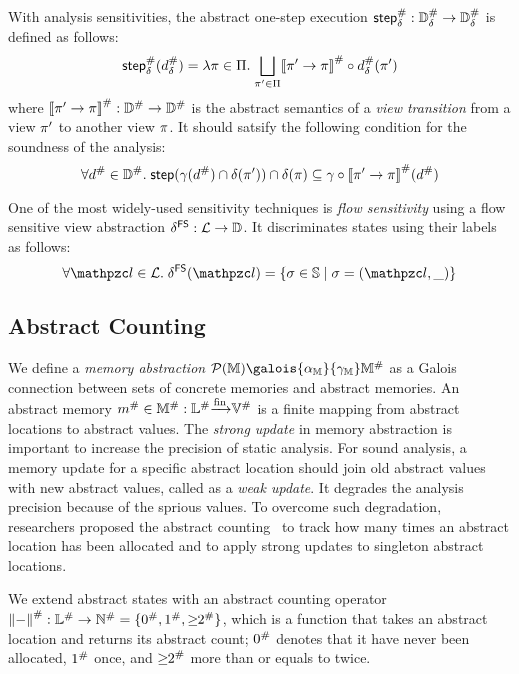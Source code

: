 With analysis sensitivities, the abstract one-step execution ${\textsf{step}}^{\#}_\delta:
{\mathbb{D}}^{\#}_\delta \rightarrow {\mathbb{D}}^{\#}_\delta$ is defined as follows:
\[
  {\textsf{step}}^{\#}_\delta({d}^{\#}_\delta) = \lambda \pi \in \Pi. \; \underset{\pi' \in
  \Pi}{\bigsqcup}{{[\![{\pi' \rightarrow \pi}]\!]}^{\#} \circ {d}^{\#}_\delta(\pi')}
\]
where ${[\![{\pi' \rightarrow \pi}]\!]}^{\#}: {\mathbb{D}}^{\#} \rightarrow {\mathbb{D}}^{\#}$ is the abstract
semantics of a \textit{view transition} from a view $\pi'$ to another view
$\pi$.  It should satsify the following condition for the soundness of the
analysis:
\[
  \forall {d}^{\#} \in {\mathbb{D}}^{\#}. \; \textsf{step}(\gamma({d}^{\#}) \cap \delta(\pi'))
  \cap \delta(\pi) \subseteq \gamma \circ
  {[\![{\pi' \rightarrow \pi}]\!]}^{\#}({d}^{\#})
\]

One of the most widely-used sensitivity techniques is \textit{flow sensitivity}
using a flow sensitive view abstraction $\delta^{\textsf{FS}}: \mathcal{L} \rightarrow \mathbb{D}$.
It discriminates states using their labels as follows:
\[
  \forall \lab \in \labset. \; \fsviewmap(\lab) = \{ \st \in \stset \mid \st =
  (\lab, \_) \}
\]


\subsection{Abstract Counting}

We define a \textit{memory abstraction} $\powerset{\memset}
\galois{\alpha_\memset}{\gamma_\memset} \absmemset$ as a Galois connection
between sets of concrete memories and abstract memories.  An abstract memory
${m}^{\#} \in {\mathbb{M}}^{\#}: {\mathbb{L}}^{\#} {\xrightarrow[]{\text{fin}}} {\mathbb{V}}^{\#}$ is a finite mapping from
abstract locations to abstract values.  The \textit{strong update} in memory
abstraction is important to increase the precision of static analysis.  For
sound analysis, a memory update for a specific abstract location should join old
abstract values with new abstract values, called as a \textit{weak update}.
It degrades the analysis precision because of the sprious values.  To overcome
such degradation, researchers proposed the abstract
counting~\cite{abstract-gc-counting, revisit-recency} to track how many times an
abstract location has been allocated and to apply strong updates to singleton
abstract locations.

We extend abstract states with an abstract counting operator ${\lVert-\rVert}^{\#}:
{\mathbb{L}}^{\#} \rightarrow {\mathbb{N}}^{\#} = \{ {0}^{\#}, {1}^{\#}, {\geq\!\!2}^{\#} \}$, which
is a function that takes an abstract location and returns its abstract count;
${0}^{\#}$ denotes that it have never been allocated, ${1}^{\#}$ once, and
${\geq\!\!2}^{\#}$ more than or equals to twice.


